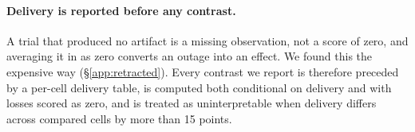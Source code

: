 \paragraph{Delivery is reported before any contrast.} A trial that produced no artifact is
a missing observation, not a score of zero, and averaging it in as zero converts an outage
into an effect. We found this the expensive way (\S\ref{app:retracted}). Every contrast we
report is therefore preceded by a per-cell delivery table, is computed both conditional on
delivery and with losses scored as zero, and is treated as uninterpretable when delivery
differs across compared cells by more than 15 points.
